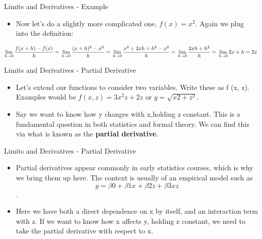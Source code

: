 \documentclass[
  ignorenonframetext,
]{beamer}
\providecommand{\tightlist}{%
  \setlength{\itemsep}{0pt}\setlength{\parskip}{0pt}}
\begin{document}
\begin{frame}{Limits and Derivatives - Example}
\protect\hypertarget{limits-and-derivatives---example-1}{}

\begin{itemize}
\tightlist
\item
  Now let's do a slightly more complicated one, \(f(x) = x^{2}\). Again
  we plug into the definition:
\end{itemize}

\[ \lim_{h \to 0}\frac{f(x + h) -f(x)}{h}= \\ \lim_{h \to 0}\frac{(x+ h)^{2} - x^{2}}{h} = \\ \lim_{h \to 0}\frac{x^{2}+2xh+h^{2}-x^{2}}{h}= \\
\\ \lim_{h \to 0}\frac{2xh+h^{2}}{h}=
\\ \lim_{h \to 0}2x+h = \\ 2x\]

\end{frame}

\begin{frame}{Limits and Derivatives - Partial Derivative}
\protect\hypertarget{limits-and-derivatives---partial-derivative}{}

\begin{itemize}
\item
  Let's extend our functions to consider two variables. Write these as f
  (x, z). Examples would be \(f (x, z) = 3x^{2}z+2z\) or
  \(y=\sqrt{x2 +z^{2}}\).
\item
  Say we want to know how y changes with x,holding z constant. This is a
  fundamental question in both statistics and formal theory. We can find
  this via what is known as the \textbf{partial derivative}.
\end{itemize}

\end{frame}

\begin{frame}{Limits and Derivatives - Partial Derivative}
\protect\hypertarget{limits-and-derivatives---partial-derivative-1}{}

\begin{itemize}
\item
  Partial derivatives appear commonly in early statistics courses, which
  is why we bring them up here. The context is usually of an empirical
  model such as \[y = β0 +β1x+β2z+β3xz\].
\item
  Here we have both a direct dependence on x by itself, and an
  interaction term with z. If we want to know how x affects y, holding z
  constant, we need to take the partial derivative with respect to x.
\end{itemize}

\end{frame}
\end{document}
